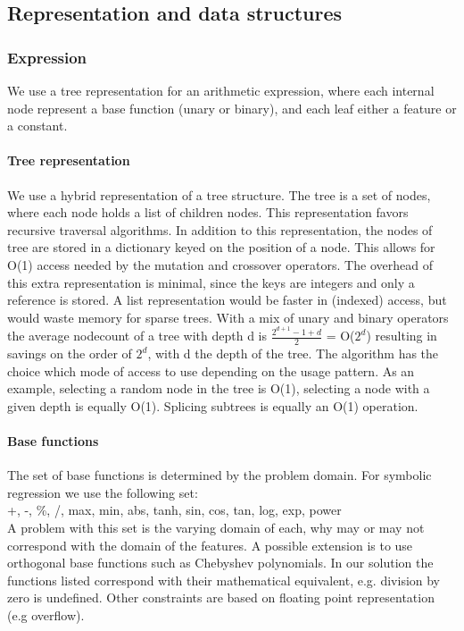 \subsection{Representation and data structures}
\subsubsection{Expression}
We use a tree representation for an arithmetic expression, where each internal node represent a base function (unary or binary), and each leaf either a feature or a constant.

\paragraph{Tree representation}
We use a hybrid representation of a tree structure. The tree is a set of nodes, where each node holds a list of children nodes. This representation favors recursive traversal algorithms. In addition to this representation, the nodes of tree are stored in a dictionary keyed on the position of a node. This allows for O(1) access needed by the mutation and crossover operators. The overhead of this extra representation is minimal, since the keys are integers and only a reference is stored. A list representation would be faster in (indexed) access, but would waste memory for sparse trees. With a mix of unary and binary operators the average nodecount of a tree with depth d is $\frac{2^{d+1}-1  + d}{2}$ = O($2^d$) resulting in savings on the order of $2^d$, with d the depth of the tree.
The algorithm has the choice which mode of access to use depending on the usage pattern. As an example, selecting a random node in the tree is O(1), selecting a node with a given depth is equally O(1). Splicing subtrees is equally an O(1) operation.

\paragraph{Base functions}
The set of base functions is determined by the problem domain. For symbolic regression we use the following set:\\
+, -, \%, /, max, min, abs, tanh, sin, cos, tan, log, exp, power\\
A problem with this set is the varying domain of each, why may or may not correspond with the domain of the features. A possible extension is to use orthogonal base functions such as Chebyshev polynomials. In our solution the functions listed correspond with their mathematical equivalent, e.g. division by zero is undefined. Other constraints are based on floating point representation (e.g overflow).

